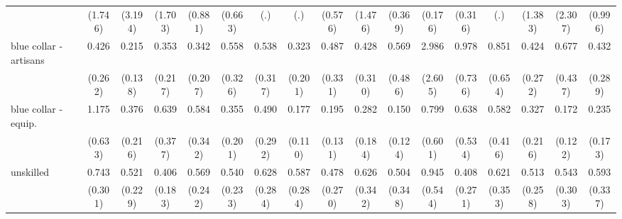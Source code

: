 {\begin{tabular}{l*{16}{c}}
                    &     (1.746)         &     (3.194)         &     (1.703)         &     (0.881)         &     (0.663)         &         (.)         &         (.)         &     (0.576)         &     (1.476)         &     (0.369)         &     (0.176)         &     (0.316)         &         (.)         &     (1.383)         &     (2.307)         &     (0.996)         \\
[1em]
blue collar - artisans&       0.426         &       0.215\sym{*}  &       0.353         &       0.342         &       0.558         &       0.538         &       0.323         &       0.487         &       0.428         &       0.569         &       2.986         &       0.978         &       0.851         &       0.424         &       0.677         &       0.432         \\
                    &     (0.262)         &     (0.138)         &     (0.217)         &     (0.207)         &     (0.326)         &     (0.317)         &     (0.201)         &     (0.331)         &     (0.310)         &     (0.486)         &     (2.605)         &     (0.736)         &     (0.654)         &     (0.272)         &     (0.437)         &     (0.289)         \\
[1em]
blue collar - equip.&       1.175         &       0.376         &       0.639         &       0.584         &       0.355         &       0.490         &       0.177\sym{**} &       0.195\sym{*}  &       0.282         &       0.150\sym{*}  &       0.799         &       0.638         &       0.582         &       0.327         &       0.172\sym{*}  &       0.235\sym{*}  \\
                    &     (0.633)         &     (0.216)         &     (0.377)         &     (0.342)         &     (0.201)         &     (0.292)         &     (0.110)         &     (0.131)         &     (0.184)         &     (0.124)         &     (0.601)         &     (0.534)         &     (0.416)         &     (0.216)         &     (0.122)         &     (0.173)         \\
[1em]
unskilled           &       0.743         &       0.521         &       0.406\sym{*}  &       0.569         &       0.540         &       0.628         &       0.587         &       0.478         &       0.626         &       0.504         &       0.945         &       0.408         &       0.621         &       0.513         &       0.543         &       0.593         \\
                    &     (0.301)         &     (0.229)         &     (0.183)         &     (0.242)         &     (0.233)         &     (0.284)         &     (0.284)         &     (0.270)         &     (0.342)         &     (0.348)         &     (0.544)         &     (0.271)         &     (0.353)         &     (0.258)         &     (0.303)         &     (0.337)         \\

\end{tabular}}
